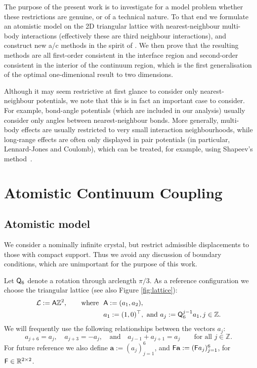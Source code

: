 \documentclass[12pt, reqno, a4paper]{amsart}
\numberwithin{equation}{section}
\numberwithin{theorem}{section}
\numberwithin{remark}{section}
\begin{document}
The purpose of the present work is to investigate for a model problem
whether these restrictions are genuine, or of a technical nature.  To
that end we formulate an atomistic model on the 2D triangular lattice
with nearest-neighbour multi-body interactions (effectively these are
third neighbour interactions), and construct new a/c methods in the
spirit of \cite{E:2006, Shimokawa:2004}. We then prove that the
resulting methods are all first-order consistent in the interface
region and second-order consistent in the interior of the continuum
region, which is the first generalisation of the optimal
one-dimenional result \cite[Theorem 3.1]{Ortner:qnl.1d} to two
dimensions.

Although it may seem restrictive at first glance to consider only
nearest-neighbour potentials, we note that this is in fact an
important case to consider. For example, bond-angle potentials (which
are included in our analysis) usually consider only angles between
nearest-neighbour bonds. More generally, multi-body effects are
usually restricted to very small interaction neighbourhoods, while
long-range effects are often only displayed in pair potentials (in
particular, Lennard-Jones and Coulomb), which can be treated, for
example, using Shapeev's method~\cite{OrtShap:2011a, Shapeev:2010a,
  Shapeev:2011a}.

\section{Atomistic Continuum Coupling}
\label{sec:stress}

\subsection{Atomistic model}
\label{sec:flat:a}
We consider a nominally infinite crystal, but restrict admissible
displacements to those with compact support. Thus we avoid any
discussion of boundary conditions, which are unimportant for the
purpose of this work.

Let ${{\sf Q}}_6$ denote a rotation through arclength $\pi/3$. As a
reference configuration we choose the triangular lattice (see also
Figure \ref{fig:lattice}):
\begin{align*}
  
  {\mathcal{L}} := {{\sf A}} {\mathbb{Z}}^2, \qquad \text{where } &~{{\sf A}} := (a_1, a_2), \\
  &~a_1 := (1, 0)^\top, \text{ and } a_j := {{\sf Q}}_6^{j-1} a_1, j \in {\mathbb{Z}}.
\end{align*}
We will frequently use the following relationships between the vectors
$a_j$:
\begin{displaymath}
  
  a_{j+6} = a_{j}, \quad a_{j+3} = -a_j, \quad \text{and} \quad
  a_{j-1} + a_{j+1} = a_j \qquad \text{for all } j \in {\mathbb{Z}}.
\end{displaymath}
For future reference we also define $\mathbf{a} := (a_j)_{j=1}^6$, and
${{\sf F}} \mathbf{a} := ({{\sf F}} a_j)_{j = 1}^6$, for ${{\sf F}} \in {\mathbb{R}}^{2 \times 2}$.
\end{document}
